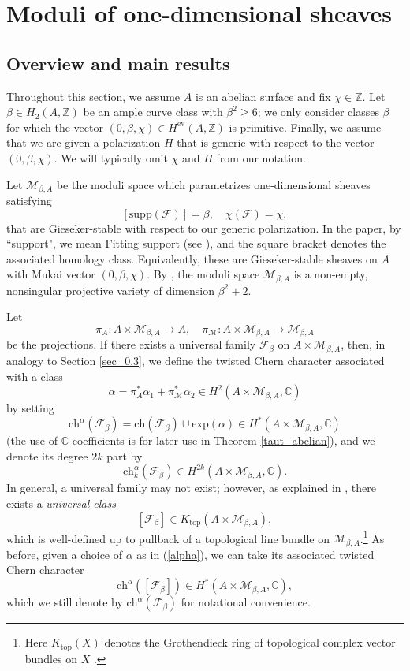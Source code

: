 \documentclass[11pt]{amsart}
\theoremstyle{plain}
\theoremstyle{definition}
\theoremstyle{remark}
\newcommand{\BC}{{\mathbb{C}}}
\newcommand{\BZ}{{\mathbb{Z}}}
\newcommand{\CF}{{\mathcal F}}
\newcommand{\CM}{{\mathcal M}}
\begin{document}
\section{Moduli of one-dimensional sheaves}
\subsection{Overview and main results}\label{Sec2.1}
Throughout this section, we assume $A$ is an abelian surface and fix  $\chi \in \mathbb{Z}$.  Let $\beta \in H_2(A, \BZ)$ be an ample curve class with $\beta^2 \geq 6$; we only consider classes $\beta$ for which the vector $(0,\beta,\chi)\in H^{\mathrm{ev}}(A,\BZ)$ is primitive.
Finally, we assume that we are given a polarization $H$ that is generic with respect to the vector $(0, \beta, \chi)$.  We will typically omit $\chi$ and $H$ from our notation.

Let $\CM_{\beta,A}$ be the moduli space which parametrizes one-dimensional sheaves satisfying
\begin{equation}\label{given_d}
[\mathrm{supp}(\CF)]= \beta, \quad \chi(\CF) = \chi,
\end{equation}
that are Gieseker-stable with respect to our generic polarization. In the paper, by ``support", we mean Fitting support (see \cite{LP1}), and the square bracket denotes the associated homology class.
Equivalently, these are Gieseker-stable sheaves on $A$ with Mukai vector $(0, \beta, \chi)$.
By  \cite{Yo}, the moduli space $\CM_{\beta,A}$
 is a non-empty, nonsingular projective variety of dimension $\beta^2+2$. 


Let
\[
\pi_A: A\times \CM_{\beta,A} \to A, \quad \pi_\CM: A\times \CM_{\beta,A} \to \CM_{\beta,A}
\]
be the projections. 
If there exists a universal family $\CF_\beta$ on $A \times \CM_{\beta,A}$, then, in analogy to Section \ref{sec_0.3}, we define the twisted Chern character associated with a class 
\begin{equation}\label{alpha}
\alpha = \pi_A^\ast \alpha_1 + \pi_\CM^\ast \alpha_2 \in H^2(A\times \CM_{\beta,A}, \BC)
\end{equation}
by setting
\[
\mathrm{ch}^\alpha(\CF_\beta) = \mathrm{ch}(\CF_\beta) \cup \mathrm{exp}(\alpha) \in H^{*}(A \times \CM_{\beta,A}, \BC)
\]
(the use of $\BC$-coefficients is for later use in Theorem \ref{taut_abelian}),
and we denote its degree  $2k$ part by
\[
\mathrm{ch}_k^\alpha(\CF_\beta) \in H^{2k}(A\times \CM_{\beta,A}, \BC).
\]
In general, a universal family may not exist; however, as explained in \cite[Section 3.1]{Markman5}, there exists
a \emph{universal class} 
\[
[\CF_\beta] \in K_{\mathrm{top}}(A \times \CM_{\beta,A}),
\]
which is well-defined up to pullback of a topological line bundle on $\CM_{\beta,A}$.\footnote{Here $K_{\mathrm{top}}(X)$ denotes the Grothendieck ring of topological complex vector bundles on $X$ \cite{At}.}
As before, given a choice of $\alpha$ as in (\ref{alpha}), we can take its associated twisted Chern character 
\[
\mathrm{ch}^{\alpha}([\CF_\beta]) \in H^{*}(A \times \CM_{\beta,A}, \BC),
\]
which we still denote by $\mathrm{ch}^{\alpha}(\CF_\beta)$ for notational convenience.
\end{document}
